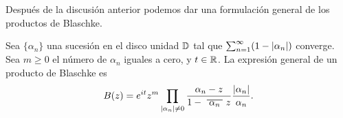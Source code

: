 Después de la discusión anterior podemos dar una formulación general de los productos de Blaschke. \\

\begin{corollary}
    Sea $\{\alpha_n\}$ una sucesión en el disco unidad $\mathbb{D}$ tal que $\sum_{n=1}^{\infty} (1 - \left\lvert\alpha_n\right\rvert)$ converge. Sea $m \geq 0$ el número de $\alpha_n$ iguales a cero, y $t \in \mathbb{R}$. La expresión general de un producto de Blaschke es
    \begin{equation*}
        B(z) = e^{it}z^m \prod_{\abs{\alpha_n} \not = 0} \frac{\alpha_n - z}{1 - \xbar{\alpha_n}z} \dfrac{\abs{\alpha_n}}{\alpha_n}.
    \end{equation*}
\end{corollary}


